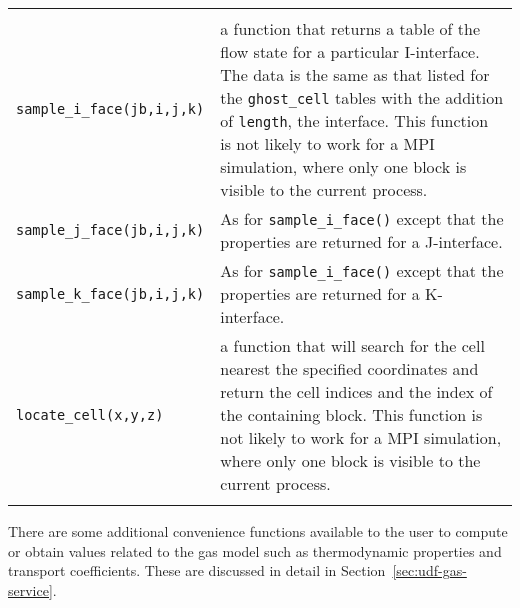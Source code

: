 \begin{tabular}{ll}
{} \\
 \texttt{sample\_i\_face(jb,i,j,k)} & \parbox{10cm}{a function that returns a table of 
                                      the flow state for a particular I-interface.  The data is the same as that
                                      listed for the \texttt{ghost\_cell} tables with the addition of \texttt{length},
                                      the interface.  This function is not likely to work for a MPI simulation,
                                      where only one block is visible to the current process.
} \\
 \texttt{sample\_j\_face(jb,i,j,k)} & \parbox{10cm}{As for \texttt{sample\_i\_face()} except that the properties
                                      are returned for a J-interface.
} \\
 \texttt{sample\_k\_face(jb,i,j,k)} & \parbox{10cm}{As for \texttt{sample\_i\_face()} except that the properties
                                      are returned for a K-interface.
} \\
 \noalign{\smallskip} \hline \noalign{\smallskip}
 \texttt{locate\_cell(x,y,z)} & \parbox{10cm}{a function that will search for the cell nearest 
                                      the specified coordinates and return the cell indices
                                      and the index of the containing block.  This function 
                                      is not likely to work for a MPI simulation,
                                      where only one block is visible to the current process.} \\
 \noalign{\smallskip} \hline \noalign{\smallskip}
\end{tabular}

\noindent

There are some additional convenience functions available to the user to compute or obtain
values related to the gas model such as thermodynamic properties and transport coefficients.
These are discussed in detail in Section~\ref{sec:udf-gas-service}.

